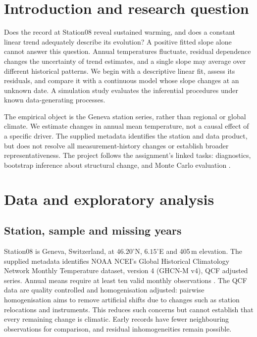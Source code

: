 \documentclass[11pt,a4paper]{article}
\begin{document}
\tableofcontents
\thispagestyle{plain}
\clearpage
{}

\section{Introduction and research question}
Does the record at Station08 reveal sustained warming, and does a constant linear trend adequately describe its evolution? A positive fitted slope alone cannot answer this question. Annual temperatures fluctuate, residual dependence changes the uncertainty of trend estimates, and a single slope may average over different historical patterns. We begin with a descriptive linear fit, assess its residuals, and compare it with a continuous model whose slope changes at an unknown date. A simulation study evaluates the inferential procedures under known data-generating processes.

The empirical object is the Geneva station series, rather than regional or global climate. We estimate changes in annual mean temperature, not a causal effect of a specific driver. The supplied metadata identifies the station and data product, but does not resolve all measurement-history changes or establish broader representativeness. The project follows the assignment's linked tasks: diagnostics, bootstrap inference about structural change, and Monte Carlo evaluation \cite{handout}.

\section{Data and exploratory analysis}
\subsection{Station, sample and missing years}
Station08 is Geneva, Switzerland, at $46.20^\circ$N, $6.15^\circ$E and 405\,m elevation. The supplied metadata identifies NOAA NCEI's Global Historical Climatology Network Monthly Temperature dataset, version 4 (GHCN-M v4), QCF adjusted series. Annual means require at least ten valid monthly observations \cite{menne,stationdata}. The QCF data are quality controlled and homogenisation adjusted: pairwise homogenisation aims to remove artificial shifts due to changes such as station relocations and instruments. This reduces such concerns but cannot establish that every remaining change is climatic. Early records have fewer neighbouring observations for comparison, and residual inhomogeneities remain possible.
\end{document}
